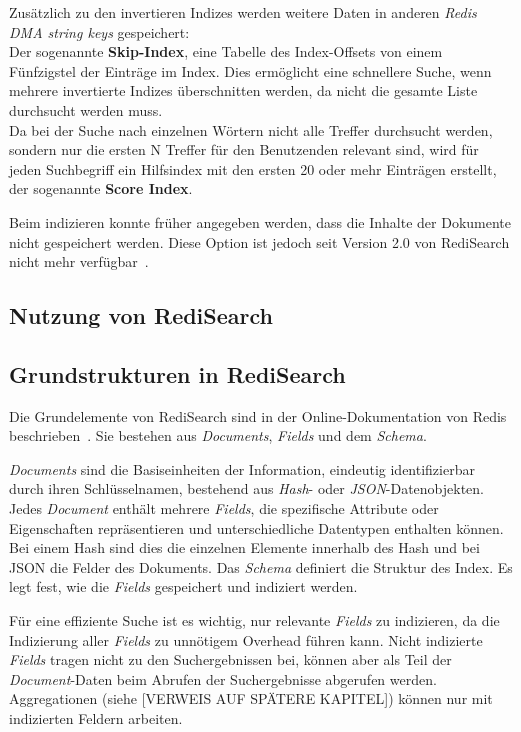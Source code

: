 Zusätzlich zu den invertieren Indizes werden weitere Daten in anderen \textit{Redis DMA string keys} gespeichert:\\
Der sogenannte \textbf{Skip-Index}, eine Tabelle des Index-Offsets von einem Fünfzigstel der Einträge im Index. Dies ermöglicht eine schnellere Suche, wenn mehrere invertierte Indizes überschnitten werden, da nicht die gesamte Liste durchsucht werden muss.\\
Da bei der Suche nach einzelnen Wörtern nicht alle Treffer durchsucht werden, sondern nur die ersten N Treffer für den Benutzenden relevant sind, wird für jeden Suchbegriff ein Hilfsindex mit den ersten 20 oder mehr Einträgen erstellt, der sogenannte \textbf{Score Index}.

Beim indizieren konnte früher angegeben werden, dass die Inhalte der Dokumente nicht gespeichert werden. Diese Option ist jedoch seit Version 2.0 von RediSearch nicht mehr verfügbar~\cite{redis_ltd_upgrade_nodate, korland_missing_nodate}.

\subsection{Nutzung von RediSearch} %

\subsection{Grundstrukturen in RediSearch}
Die Grundelemente von RediSearch sind in der Online-Dokumentation von Redis beschrieben~\cite{redis_ltd_basic_nodate}.
Sie bestehen aus \emph{Documents}, \emph{Fields} und dem \emph{Schema}.

\emph{Documents} sind die Basiseinheiten der Information, eindeutig identifizierbar durch ihren Schlüsselnamen, bestehend aus \emph{Hash}- oder \emph{JSON}-Datenobjekten. Jedes \emph{Document} enthält mehrere \emph{Fields}, die spezifische Attribute oder Eigenschaften repräsentieren und unterschiedliche Datentypen enthalten können. Bei einem Hash sind dies die einzelnen Elemente innerhalb des Hash und bei JSON die Felder des Dokuments.
Das \emph{Schema} definiert die Struktur des Index. Es legt fest, wie die \emph{Fields} gespeichert und indiziert werden.

Für eine effiziente Suche ist es wichtig, nur relevante \emph{Fields} zu indizieren, da die Indizierung aller \emph{Fields} zu unnötigem Overhead führen kann. Nicht indizierte \emph{Fields} tragen nicht zu den Suchergebnissen bei, können aber als Teil der \emph{Document}-Daten beim Abrufen der Suchergebnisse abgerufen werden. Aggregationen (siehe [VERWEIS AUF SPÄTERE KAPITEL]) können nur mit indizierten Feldern arbeiten. %

